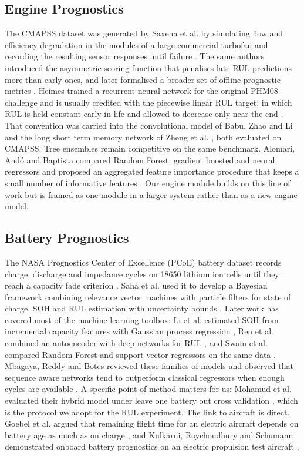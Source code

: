 \documentclass[conference]{IEEEtran}
\begin{document}
\subsection{Engine Prognostics}
The CMAPSS dataset was generated by Saxena et al. by simulating flow and efficiency degradation in the modules of a large commercial turbofan and recording the resulting sensor responses until failure \cite{b8}. The same authors introduced the asymmetric scoring function that penalises late RUL predictions more than early ones, and later formalised a broader set of offline prognostic metrics \cite{b14}. Heimes trained a recurrent neural network for the original PHM08 challenge and is usually credited with the piecewise linear RUL target, in which RUL is held constant early in life and allowed to decrease only near the end \cite{b10}. That convention was carried into the convolutional model of Babu, Zhao and Li \cite{b11} and the long short term memory network of Zheng et al. \cite{b12}, both evaluated on CMAPSS. Tree ensembles remain competitive on the same benchmark. Alomari, And\'o and Baptista compared Random Forest, gradient boosted and neural regressors and proposed an aggregated feature importance procedure that keeps a small number of informative features \cite{b13}. Our engine module builds on this line of work but is framed as one module in a larger system rather than as a new engine model.

\subsection{Battery Prognostics}
The NASA Prognostics Center of Excellence (PCoE) battery dataset records charge, discharge and impedance cycles on 18650 lithium ion cells until they reach a capacity fade criterion \cite{b16}. Saha et al. used it to develop a Bayesian framework combining relevance vector machines with particle filters for state of charge, SOH and RUL estimation with uncertainty bounds \cite{b17}. Later work has covered most of the machine learning toolbox: Li et al. estimated SOH from incremental capacity features with Gaussian process regression \cite{b18}, Ren et al. combined an autoencoder with deep networks for RUL \cite{b19}, and Swain et al. compared Random Forest and support vector regressors on the same data \cite{b20}. Mbagaya, Reddy and Botes reviewed these families of models and observed that sequence aware networks tend to outperform classical regressors when enough cycles are available \cite{b21}. A specific point of method matters for us: Mohamud et al. evaluated their hybrid model under leave one battery out cross validation \cite{b24}, which is the protocol we adopt for the RUL experiment. The link to aircraft is direct. Goebel et al. argued that remaining flight time for an electric aircraft depends on battery age as much as on charge \cite{b22}, and Kulkarni, Roychoudhury and Schumann demonstrated onboard battery prognostics on an electric propulsion test aircraft \cite{b23}.
\end{document}
